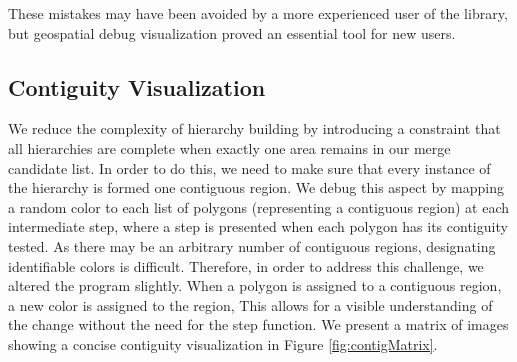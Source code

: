 These mistakes may have been avoided by a more experienced user of the library, but geospatial debug visualization proved an essential tool for new users.

\subsection{Contiguity Visualization} \label{sec:contigVis}
We reduce the complexity of hierarchy building by introducing a constraint that all hierarchies are complete when exactly one area remains in our merge candidate list. In order to do this, we need to make sure that every instance of the hierarchy is formed one contiguous region. We debug this aspect by mapping a random color to each list of polygons (representing a contiguous region) at each intermediate step, where a step is presented when each polygon has its contiguity tested. As there may be an arbitrary number of contiguous regions, designating identifiable colors is difficult. Therefore, in order to address this challenge, we altered the program slightly. When a polygon is assigned to a contiguous region, a new color is assigned to the region, This allows for a visible understanding of the change without the need for the step function. We present a matrix of images showing a concise contiguity visualization in Figure \ref{fig:contigMatrix}. 


